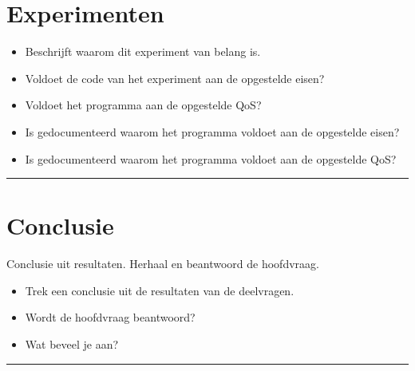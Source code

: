 \documentclass[a4paper, 11pt, oneside]{report}
\begin{document}
\chapter{Experimenten}

\begin{itemize}
\item Beschrijft waarom dit experiment van belang is.
\item Voldoet de code van het experiment aan de opgestelde eisen?
\item Voldoet het programma aan de opgestelde QoS?
\item Is gedocumenteerd waarom het programma voldoet aan de opgestelde eisen?
\item Is gedocumenteerd waarom het programma voldoet aan de opgestelde QoS?
\end{itemize}
\hrule

\chapter{Conclusie}

\label{chapter:conclusie}
Conclusie uit resultaten. Herhaal en beantwoord de hoofdvraag.
\begin{itemize}
\item Trek een conclusie uit de resultaten van de deelvragen.
\item Wordt de hoofdvraag beantwoord?
\item Wat beveel je aan?
\end{itemize}
\hrule





\clearpage
\appendix
\end{document}
